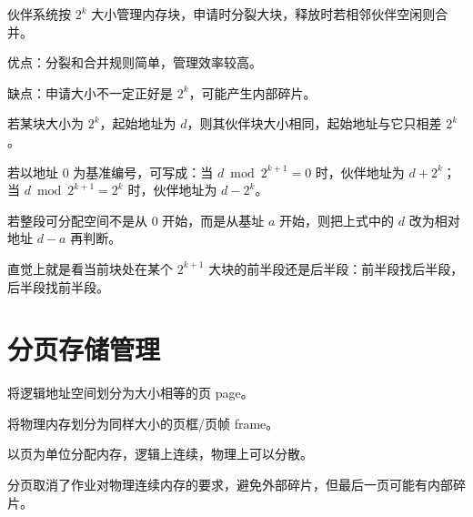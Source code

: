 \begin{points}
  \item 伙伴系统按 $2^k$ 大小管理内存块，申请时分裂大块，释放时若相邻伙伴空闲则合并。
  \item 优点：分裂和合并规则简单，管理效率较高。
  \item 缺点：申请大小不一定正好是 $2^k$，可能产生内部碎片。
\end{points}


\begin{points}
  \item 若某块大小为 $2^k$，起始地址为 $d$，则其伙伴块大小相同，起始地址与它只相差 $2^k$。
  \item 若以地址 0 为基准编号，可写成：当 $d \bmod 2^{k+1}=0$ 时，伙伴地址为 $d+2^k$；当 $d \bmod 2^{k+1}=2^k$ 时，伙伴地址为 $d-2^k$。
  \item 若整段可分配空间不是从 0 开始，而是从基址 $a$ 开始，则把上式中的 $d$ 改为相对地址 $d-a$ 再判断。
  \item 直觉上就是看当前块处在某个 $2^{k+1}$ 大块的前半段还是后半段：前半段找后半段，后半段找前半段。
\end{points}


\section{分页存储管理}
\begin{points}
  \item 将逻辑地址空间划分为大小相等的页 page。
  \item 将物理内存划分为同样大小的页框/页帧 frame。
  \item 以页为单位分配内存，逻辑上连续，物理上可以分散。
  \item 分页取消了作业对物理连续内存的要求，避免外部碎片，但最后一页可能有内部碎片。
\end{points}


